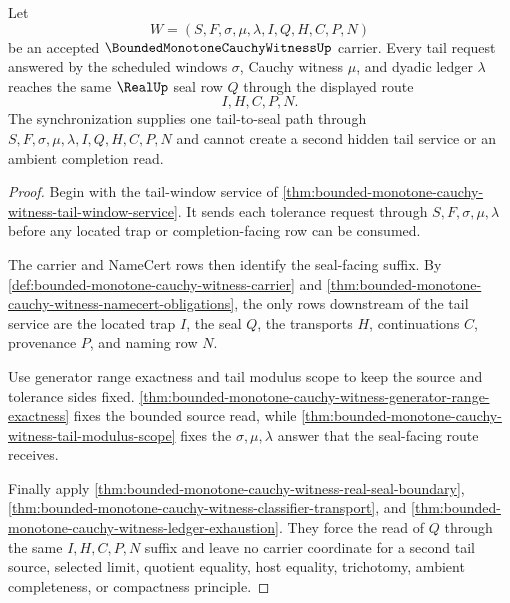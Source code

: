 \begin{theorem}
\label{thm:bounded-monotone-cauchy-witness-tail-seal-synchronization}
Let
$$
W=(S,F,\sigma,\mu,\lambda,I,Q,H,C,P,N)
$$
be an accepted $\BoundedMonotoneCauchyWitnessUp$ carrier. Every tail request answered by the scheduled windows $\sigma$, Cauchy witness $\mu$, and dyadic ledger $\lambda$ reaches the same $\RealUp$ seal row $Q$ through the displayed route
$$
I,H,C,P,N.
$$
The synchronization supplies one tail-to-seal path through $S,F,\sigma,\mu,\lambda,I,Q,H,C,P,N$ and cannot create a second hidden tail service or an ambient completion read.
\end{theorem}
\begin{proof}
Begin with the tail-window service of \autoref{thm:bounded-monotone-cauchy-witness-tail-window-service}. It sends each tolerance request through $S,F,\sigma,\mu,\lambda$ before any located trap or completion-facing row can be consumed.

The carrier and NameCert rows then identify the seal-facing suffix. By \autoref{def:bounded-monotone-cauchy-witness-carrier} and \autoref{thm:bounded-monotone-cauchy-witness-namecert-obligations}, the only rows downstream of the tail service are the located trap $I$, the seal $Q$, the transports $H$, continuations $C$, provenance $P$, and naming row $N$.

Use generator range exactness and tail modulus scope to keep the source and tolerance sides fixed. \autoref{thm:bounded-monotone-cauchy-witness-generator-range-exactness} fixes the bounded source read, while \autoref{thm:bounded-monotone-cauchy-witness-tail-modulus-scope} fixes the $\sigma,\mu,\lambda$ answer that the seal-facing route receives.

Finally apply \autoref{thm:bounded-monotone-cauchy-witness-real-seal-boundary}, \autoref{thm:bounded-monotone-cauchy-witness-classifier-transport}, and \autoref{thm:bounded-monotone-cauchy-witness-ledger-exhaustion}. They force the read of $Q$ through the same $I,H,C,P,N$ suffix and leave no carrier coordinate for a second tail source, selected limit, quotient equality, host equality, trichotomy, ambient completeness, or compactness principle.
\end{proof}

